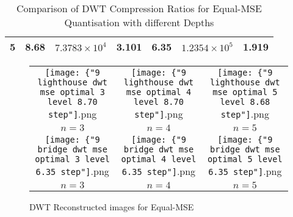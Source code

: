 \documentclass{article}					%
\begin{document}
\begin{appendices}
\begin{table}[h!]
\begin{centering}
\begin{tabular}{l|l|l|l|l|l|l|}
\multicolumn{1}{|l|}{5}                                                              & 8.68                                                                 & $7.3783\times 10^4$     & 3.101                                                                & 6.35                                                                 & $1.2354\times 10^5$     & 1.919                                                                \\ \hline
\end{tabular}
\caption{Comparison of DWT Compression Ratios for Equal-MSE Quantisation with different Depths}
\end{centering}
\end{table}

\begin{figure}[h!]
\begin{centering}
\begin{tabular}{c c c}
  \texttt{[image: \{"9 lighthouse dwt mse optimal 3 level 8.70 step"]}.png} & \texttt{[image: \{"9 lighthouse dwt mse optimal 4 level 8.70 step"]}.png} & \texttt{[image: \{"9 lighthouse dwt mse optimal 5 level 8.68 step"]}.png} \\
  $n=3$ & $n=4$ & $n=5$\\
  \texttt{[image: \{"9 bridge dwt mse optimal 3 level 6.35 step"]}.png} & \texttt{[image: \{"9 bridge dwt mse optimal 4 level 6.35 step"]}.png} & \texttt{[image: \{"9 bridge dwt mse optimal 5 level 6.35 step"]}.png} \\
  $n=3$ & $n=4$ & $n=5$\\
\end{tabular}
\caption{DWT Reconstructed images for Equal-MSE}
\end{centering}
\end{figure}


\end{appendices}
\end{document}
